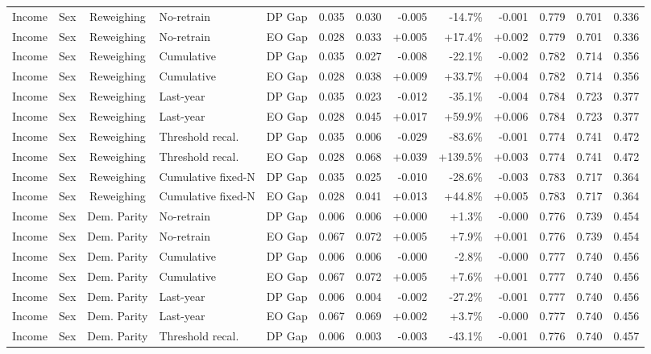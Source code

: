 \begin{longtable}{llcllrrrrrrrr}
Income & Sex & Reweighing & No-retrain & DP Gap & 0.035 & 0.030 & -0.005 & -14.7\% & -0.001 & 0.779 & 0.701 & 0.336 \\
Income & Sex & Reweighing & No-retrain & EO Gap & 0.028 & 0.033 & +0.005 & +17.4\% & +0.002 & 0.779 & 0.701 & 0.336 \\
Income & Sex & Reweighing & Cumulative & DP Gap & 0.035 & 0.027 & -0.008 & -22.1\% & -0.002 & 0.782 & 0.714 & 0.356 \\
Income & Sex & Reweighing & Cumulative & EO Gap & 0.028 & 0.038 & +0.009 & +33.7\% & +0.004 & 0.782 & 0.714 & 0.356 \\
Income & Sex & Reweighing & Last-year & DP Gap & 0.035 & 0.023 & -0.012 & -35.1\% & -0.004 & 0.784 & 0.723 & 0.377 \\
Income & Sex & Reweighing & Last-year & EO Gap & 0.028 & 0.045 & +0.017 & +59.9\% & +0.006 & 0.784 & 0.723 & 0.377 \\
Income & Sex & Reweighing & Threshold recal. & DP Gap & 0.035 & 0.006 & -0.029 & -83.6\% & -0.001 & 0.774 & 0.741 & 0.472 \\
Income & Sex & Reweighing & Threshold recal. & EO Gap & 0.028 & 0.068 & +0.039 & +139.5\% & +0.003 & 0.774 & 0.741 & 0.472 \\
Income & Sex & Reweighing & Cumulative fixed-N & DP Gap & 0.035 & 0.025 & -0.010 & -28.6\% & -0.003 & 0.783 & 0.717 & 0.364 \\
Income & Sex & Reweighing & Cumulative fixed-N & EO Gap & 0.028 & 0.041 & +0.013 & +44.8\% & +0.005 & 0.783 & 0.717 & 0.364 \\
Income & Sex & Dem. Parity & No-retrain & DP Gap & 0.006 & 0.006 & +0.000 & +1.3\% & -0.000 & 0.776 & 0.739 & 0.454 \\
Income & Sex & Dem. Parity & No-retrain & EO Gap & 0.067 & 0.072 & +0.005 & +7.9\% & +0.001 & 0.776 & 0.739 & 0.454 \\
Income & Sex & Dem. Parity & Cumulative & DP Gap & 0.006 & 0.006 & -0.000 & -2.8\% & -0.000 & 0.777 & 0.740 & 0.456 \\
Income & Sex & Dem. Parity & Cumulative & EO Gap & 0.067 & 0.072 & +0.005 & +7.6\% & +0.001 & 0.777 & 0.740 & 0.456 \\
Income & Sex & Dem. Parity & Last-year & DP Gap & 0.006 & 0.004 & -0.002 & -27.2\% & -0.001 & 0.777 & 0.740 & 0.456 \\
Income & Sex & Dem. Parity & Last-year & EO Gap & 0.067 & 0.069 & +0.002 & +3.7\% & -0.000 & 0.777 & 0.740 & 0.456 \\
Income & Sex & Dem. Parity & Threshold recal. & DP Gap & 0.006 & 0.003 & -0.003 & -43.1\% & -0.001 & 0.776 & 0.740 & 0.457 \\

\end{longtable}
